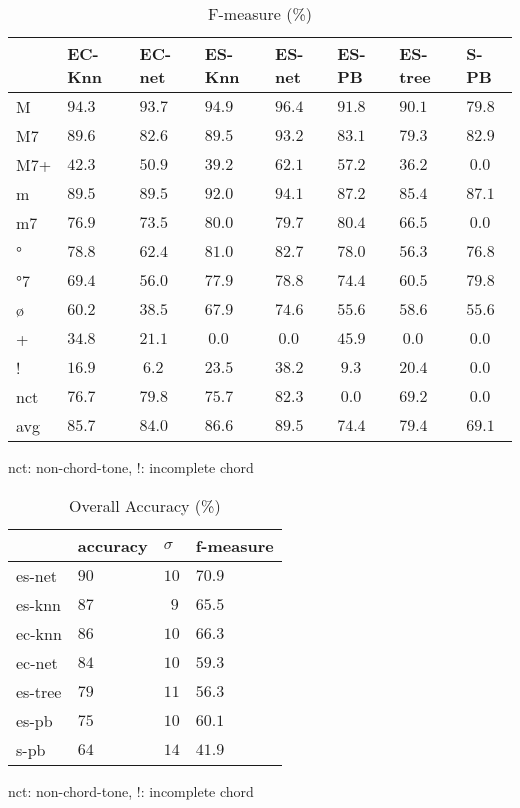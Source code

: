 \documentclass{article}
\begin{document}
\begin{table}
  \centering
  \begin{tabular}{l|p{.5cm}p{.5cm}p{.5cm}p{.5cm}p{.5cm}p{.5cm}p{.5cm}}
         
   &EC-Knn &EC-net &ES-Knn &ES-net &ES-PB  &ES-tree&S-PB   \\
\hline                                            
M  & $94.3$&$ 93.7$&$ 94.9$&$ 96.4$&$ 91.8$&$ 90.1$&$ 79.8$\\
M7 & $89.6$&$ 82.6$&$ 89.5$&$ 93.2$&$ 83.1$&$ 79.3$&$ 82.9$\\
M7+& $42.3$&$ 50.9$&$ 39.2$&$ 62.1$&$ 57.2$&$ 36.2$&$~ 0.0$\\
m  & $89.5$&$ 89.5$&$ 92.0$&$ 94.1$&$ 87.2$&$ 85.4$&$ 87.1$\\
m7 & $76.9$&$ 73.5$&$ 80.0$&$ 79.7$&$ 80.4$&$ 66.5$&$~ 0.0$\\
°  & $78.8$&$ 62.4$&$ 81.0$&$ 82.7$&$ 78.0$&$ 56.3$&$ 76.8$\\
°7 & $69.4$&$ 56.0$&$ 77.9$&$ 78.8$&$ 74.4$&$ 60.5$&$ 79.8$\\
ø  & $60.2$&$ 38.5$&$ 67.9$&$ 74.6$&$ 55.6$&$ 58.6$&$ 55.6$\\
+  & $34.8$&$ 21.1$&$~ 0.0$&$~ 0.0$&$ 45.9$&$~ 0.0$&$~ 0.0$\\
!  & $16.9$&$~ 6.2$&$ 23.5$&$ 38.2$&$~ 9.3$&$ 20.4$&$~ 0.0$\\
nct& $76.7$&$ 79.8$&$ 75.7$&$ 82.3$&$~ 0.0$&$ 69.2$&$~ 0.0$\\
avg& $85.7$&$ 84.0$&$ 86.6$&$ 89.5$&$ 74.4$&$ 79.4$&$ 69.1$\\

  \end{tabular}                                                        

\medskip

nct: non-chord-tone, !: incomplete chord
  \caption{F-measure (\%)}
  \label{tab:f-measure}
\end{table}



\begin{table}
  \centering
  \begin{tabular}{l|p{1.5cm}p{.5cm}p{1.5cm}}
       & accuracy    & $\sigma$  & f-measure\\
\hline
es-net &$   90  $&$ 10$      &$70.9$ \\
es-knn &$   87  $&$~~9$      &$65.5$ \\
ec-knn &$   86  $&$ 10$      &$66.3$ \\
ec-net &$   84  $&$ 10$      &$59.3$ \\
es-tree&$   79  $&$ 11$      &$56.3$ \\
es-pb  &$   75  $&$ 10$      &$60.1$ \\
s-pb   &$   64  $&$ 14$      &$41.9$ \\

  \end{tabular}                                                        

\medskip

nct: non-chord-tone, !: incomplete chord
  \caption{Overall Accuracy (\%)}
  \label{tab:accuracy}
\end{table}
\end{document}
